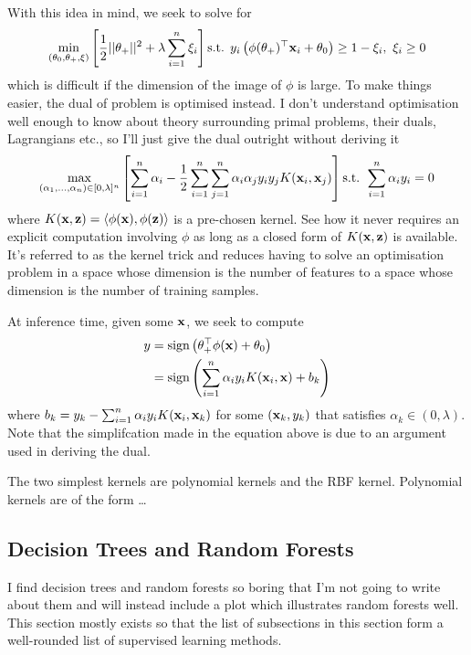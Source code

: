 \documentclass[11pt]{article}
\begin{document}
With this idea in mind, we seek to solve for
$$
\min_{(\theta_0,\theta_+,\xi)}\left[\frac{1}{2}||\theta_+||^2+\lambda\sum_{i=1}^n\xi_i\right]\text{s.t. } y_i\left(\phi(\theta_+)^\top\mathbf{x}_i+\theta_0\right)\geq 1-\xi_i,\text{ }\xi_i\geq0
$$
which is difficult if the dimension of the image of $\phi$ is large. To make things easier, the dual of problem is optimised instead. I don't understand optimisation well enough to know about theory surrounding primal problems, their duals, Lagrangians etc., so I'll just give the dual outright without deriving it
$$
\max_{(\alpha_1,\dots,\alpha_n)\in[0,\lambda]^n}\left[\sum_{i=1}^n\alpha_i-\frac{1}{2}\sum_{i=1}^n\sum_{j=1}^n\alpha_i\alpha_jy_iy_jK(\mathbf{x}_i,\mathbf{x}_j)\right]\text{s.t. }\sum_{i=1}^n\alpha_iy_i=0
$$
where $K(\mathbf{x},\mathbf{z})=\langle\phi(\mathbf{x}),\phi(\mathbf{z})\rangle$ is a pre-chosen kernel. See how it never requires an explicit computation involving $\phi$ as long as a closed form of $K(\mathbf{x},\mathbf{z})$ is available. It's referred to as the kernel trick and reduces having to solve an optimisation problem in a space whose dimension is the number of features to a space whose dimension is the number of training samples.

At inference time, given some $\mathbf{x}$, we seek to compute
\begin{align*}
    y
    &=
    \text{sign}\left(\theta_+^\top\phi(\mathbf{x})+\theta_0\right)\\
    &=
    \text{sign}\left(\sum_{i=1}^n\alpha_iy_iK(\mathbf{x}_i,\mathbf{x})+b_k\right)
\end{align*}
where $b_k=y_k-\sum_{i=1}^n\alpha_iy_iK(\mathbf{x}_i,\mathbf{x}_k)$ for some $(\mathbf{x}_k,y_k)$ that satisfies $\alpha_k\in(0,\lambda)$. Note that the simplifcation made in the equation above is due to an argument used in deriving the dual.

The two simplest kernels are polynomial kernels and the RBF kernel. Polynomial kernels are of the form \dots {}

\subsection{Decision Trees and Random Forests}
I find decision trees and random forests so boring that I'm not going to write about them and will instead include a plot which illustrates random forests well. This section mostly exists so that the list of subsections in this section form a well-rounded list of supervised learning methods.
\end{document}
